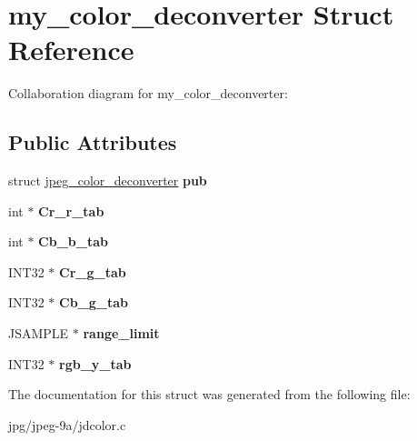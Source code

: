 \hypertarget{structmy__color__deconverter}{\section{my\+\_\+color\+\_\+deconverter Struct Reference}
\label{structmy__color__deconverter}
}


Collaboration diagram for my\+\_\+color\+\_\+deconverter\+:
\subsection*{Public Attributes}
\begin{DoxyCompactItemize}
\item 
\hypertarget{structmy__color__deconverter_a54bf241de985ca2e06da2bbee14e745a}{struct \hyperlink{structjpeg__color__deconverter}{jpeg\+\_\+color\+\_\+deconverter} {\bfseries pub}}\label{structmy__color__deconverter_a54bf241de985ca2e06da2bbee14e745a}

\item 
\hypertarget{structmy__color__deconverter_a25c4ee8d1066262c23a8181758eb0231}{int $\ast$ {\bfseries Cr\+\_\+r\+\_\+tab}}\label{structmy__color__deconverter_a25c4ee8d1066262c23a8181758eb0231}

\item 
\hypertarget{structmy__color__deconverter_aa40b60773afd04e0b076f83ed00069c9}{int $\ast$ {\bfseries Cb\+\_\+b\+\_\+tab}}\label{structmy__color__deconverter_aa40b60773afd04e0b076f83ed00069c9}

\item 
\hypertarget{structmy__color__deconverter_ab44aebbe0bd6d32aec678c71f7758bfc}{I\+N\+T32 $\ast$ {\bfseries Cr\+\_\+g\+\_\+tab}}\label{structmy__color__deconverter_ab44aebbe0bd6d32aec678c71f7758bfc}

\item 
\hypertarget{structmy__color__deconverter_abb16c33e195531366787333d6b7a2ef6}{I\+N\+T32 $\ast$ {\bfseries Cb\+\_\+g\+\_\+tab}}\label{structmy__color__deconverter_abb16c33e195531366787333d6b7a2ef6}

\item 
\hypertarget{structmy__color__deconverter_a8bae79f8adf764aa32e84a8f40b5b18b}{J\+S\+A\+M\+P\+L\+E $\ast$ {\bfseries range\+\_\+limit}}\label{structmy__color__deconverter_a8bae79f8adf764aa32e84a8f40b5b18b}

\item 
\hypertarget{structmy__color__deconverter_ad34e0f9d33aaf4b6329e65a95ec8130e}{I\+N\+T32 $\ast$ {\bfseries rgb\+\_\+y\+\_\+tab}}\label{structmy__color__deconverter_ad34e0f9d33aaf4b6329e65a95ec8130e}

\end{DoxyCompactItemize}


The documentation for this struct was generated from the following file\+:\begin{DoxyCompactItemize}
\item 
jpg/jpeg-\/9a/jdcolor.\+c\end{DoxyCompactItemize}
